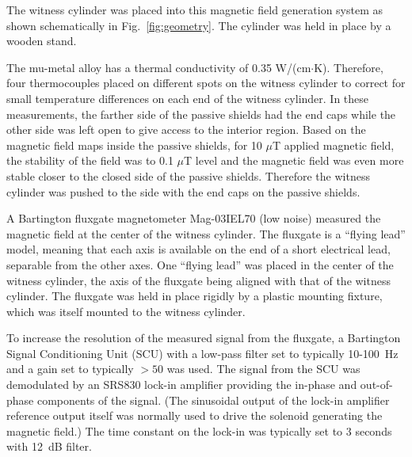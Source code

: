 The witness cylinder was placed into this magnetic field generation
system as shown schematically in Fig.~\ref{fig:geometry}.  The
cylinder was held in place by a wooden stand.


The mu-metal alloy has a thermal conductivity of 0.35
W/(cm$\cdot$K). Therefore, four thermocouples placed on different
spots on the witness cylinder to correct for small temperature
differences on each end of the witness cylinder.  In these
measurements, the farther side of the passive shields had the end caps
while the other side was left open to give access to the interior
region. Based on the magnetic field maps inside the passive shields,
for 10 $\mu$T applied magnetic field, the stability of the field was
to 0.1 $\mu$T level and the magnetic field was even more stable closer
to the closed side of the passive shields. Therefore the witness
cylinder was pushed to the side with the end caps on the passive
shields.


A Bartington fluxgate magnetometer Mag-03IEL70 (low noise) measured
the magnetic field at the center of the witness cylinder.  The
fluxgate is a ``flying lead'' model, meaning that each axis is
available on the end of a short electrical lead, separable from the
other axes.  One ``flying lead'' was placed in the center of the
witness cylinder, the axis of the fluxgate being aligned with that of
the witness cylinder.  The fluxgate was held in place rigidly by a
plastic mounting fixture, which was itself mounted to the witness
cylinder.


To increase the resolution of the measured signal from the fluxgate, a
Bartington Signal Conditioning Unit (SCU) with a low-pass filter set
to typically 10-100~Hz and a gain set to typically $>50$ was used.
The signal from the SCU was demodulated by an SRS830 lock-in amplifier
providing the in-phase and out-of-phase components of the signal.
(The sinusoidal output of the lock-in amplifier reference output
itself was normally used to drive the solenoid generating the magnetic
field.)  The time constant on the lock-in was typically set to 3
seconds with 12~dB filter.

